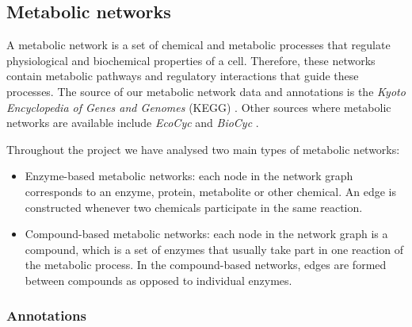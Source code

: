 \subsection{Metabolic networks}
\label{sec:meta_bck}

A metabolic network is a set of chemical and metabolic processes that regulate physiological and biochemical properties of a cell. Therefore, these networks contain metabolic pathways and regulatory interactions that guide these processes. The source of our metabolic network data and annotations is the \emph{Kyoto Encyclopedia of Genes and Genomes} (KEGG) \cite{kegg}. Other sources where metabolic networks are available include \emph{EcoCyc} \cite{ecocyc} and \emph{BioCyc} \cite{biocyc}.

Throughout the project we have analysed two main types of metabolic networks:
\begin{itemize}
 \item Enzyme-based metabolic networks: each node in the network graph corresponds to an enzyme, protein, metabolite or other chemical. An edge is constructed whenever two chemicals participate in the same reaction.
 \item Compound-based metabolic networks: each node in the network graph is a compound, which is a set of enzymes that usually take part in one reaction of the metabolic process. In the compound-based networks, edges are formed between compounds as opposed to individual enzymes.
\end{itemize}

\subsubsection{Annotations}
\label{metabolic_annotations}

